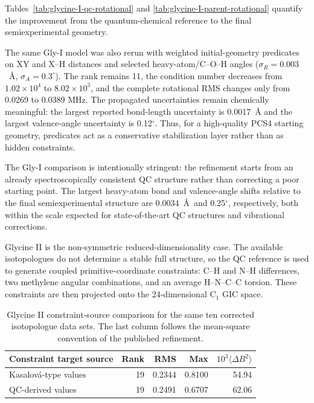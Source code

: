 \documentclass[aip,jcp,reprint,longbibliography,floatfix]{revtex4-2}
\begin{document}


Tables~\ref{tab:glycine-I-qc-rotational} and
\ref{tab:glycine-I-parent-rotational} quantify the improvement from the
quantum-chemical reference to the final semiexperimental geometry.

The same Gly-I model was also rerun with weighted initial-geometry predicates
on XY and X--H distances and selected heavy-atom/C--O--H angles
($\sigma_R=0.003$~\AA{}, $\sigma_A=0.3^\circ$). The rank remains 11, the
condition number decreases from $1.02\times10^4$ to $8.02\times10^3$, and the
complete rotational RMS changes only from 0.0269 to 0.0389 MHz. The propagated
uncertainties remain chemically meaningful: the largest reported bond-length
uncertainty is 0.0017~\AA{} and the largest valence-angle uncertainty is
0.12$^\circ$. Thus, for a high-quality PCS4 starting geometry, predicates act
as a conservative stabilization layer rather than as hidden constraints.

The Gly-I comparison is intentionally stringent: the refinement starts from an
already spectroscopically consistent QC structure rather than correcting a poor
starting point. The largest heavy-atom bond and valence-angle shifts relative
to the final semiexperimental structure are 0.0034~\AA\ and 0.25$^\circ$,
respectively, both within the scale expected for state-of-the-art QC structures
and vibrational corrections.\cite{PuzzariniStanton2023,Mendolicchio2025FastDvib}

Glycine II is the non-symmetric reduced-dimensionality case. The available
isotopologues do not determine a stable full structure, so the QC reference
is used to generate coupled primitive-coordinate constraints: C--H and N--H
differences, two methylene angular combinations, and an average H--N--C--C
torsion. These constraints are then projected onto the
24-dimensional C$_1$ GIC space.

\begin{table}[t]
\caption{Glycine II constraint-source comparison for the same ten corrected
isotopologue data sets. The last column follows the mean-square convention of
the published refinement.}
\label{tab:glycine-constraint-comparison}
\centering
\small
\begin{tabular}{lrrrr}
\toprule
Constraint target source & Rank & RMS & Max & $10^3\langle\Delta B^2\rangle$ \\
\midrule
Kasalov{\'a}-type values & 19 & 0.2344 & 0.8100 & 54.94 \\
QC-derived values & 19 & 0.2491 & 0.6707 & 62.06 \\
\bottomrule
\end{tabular}
\end{table}
\end{document}
